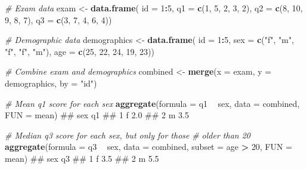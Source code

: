 \documentclass[]{book}
\newenvironment{Shaded}{\begin{snugshade}}{\end{snugshade}}
\newcommand{\KeywordTok}[1]{\textcolor[rgb]{0.13,0.29,0.53}{\textbf{#1}}}
\newcommand{\DataTypeTok}[1]{\textcolor[rgb]{0.13,0.29,0.53}{#1}}
\newcommand{\DecValTok}[1]{\textcolor[rgb]{0.00,0.00,0.81}{#1}}
\newcommand{\StringTok}[1]{\textcolor[rgb]{0.31,0.60,0.02}{#1}}
\newcommand{\CommentTok}[1]{\textcolor[rgb]{0.56,0.35,0.01}{\textit{#1}}}
\newcommand{\OperatorTok}[1]{\textcolor[rgb]{0.81,0.36,0.00}{\textbf{#1}}}
\newcommand{\NormalTok}[1]{#1}
\theoremstyle{definition}
\theoremstyle{definition}
\theoremstyle{remark}
\begin{document}
\begin{Shaded}
\begin{Highlighting}[]
\CommentTok{# Exam data}
\NormalTok{exam <-}\StringTok{ }\KeywordTok{data.frame}\NormalTok{(}
  \DataTypeTok{id =} \DecValTok{1}\OperatorTok{:}\DecValTok{5}\NormalTok{,}
  \DataTypeTok{q1 =} \KeywordTok{c}\NormalTok{(}\DecValTok{1}\NormalTok{, }\DecValTok{5}\NormalTok{, }\DecValTok{2}\NormalTok{, }\DecValTok{3}\NormalTok{, }\DecValTok{2}\NormalTok{),}
  \DataTypeTok{q2 =} \KeywordTok{c}\NormalTok{(}\DecValTok{8}\NormalTok{, }\DecValTok{10}\NormalTok{, }\DecValTok{9}\NormalTok{, }\DecValTok{8}\NormalTok{, }\DecValTok{7}\NormalTok{),}
  \DataTypeTok{q3 =} \KeywordTok{c}\NormalTok{(}\DecValTok{3}\NormalTok{, }\DecValTok{7}\NormalTok{, }\DecValTok{4}\NormalTok{, }\DecValTok{6}\NormalTok{, }\DecValTok{4}\NormalTok{))}

\CommentTok{# Demographic data}
\NormalTok{demographics <-}\StringTok{ }\KeywordTok{data.frame}\NormalTok{(}
  \DataTypeTok{id =} \DecValTok{1}\OperatorTok{:}\DecValTok{5}\NormalTok{,}
  \DataTypeTok{sex =} \KeywordTok{c}\NormalTok{(}\StringTok{"f"}\NormalTok{, }\StringTok{"m"}\NormalTok{, }\StringTok{"f"}\NormalTok{, }\StringTok{"f"}\NormalTok{, }\StringTok{"m"}\NormalTok{),}
  \DataTypeTok{age =} \KeywordTok{c}\NormalTok{(}\DecValTok{25}\NormalTok{, }\DecValTok{22}\NormalTok{, }\DecValTok{24}\NormalTok{, }\DecValTok{19}\NormalTok{, }\DecValTok{23}\NormalTok{))}

\CommentTok{# Combine exam and demographics}
\NormalTok{combined <-}\StringTok{ }\KeywordTok{merge}\NormalTok{(}\DataTypeTok{x =}\NormalTok{ exam, }
              \DataTypeTok{y =}\NormalTok{ demographics, }
              \DataTypeTok{by =} \StringTok{"id"}\NormalTok{)}

\CommentTok{# Mean q1 score for each sex}
\KeywordTok{aggregate}\NormalTok{(}\DataTypeTok{formula =}\NormalTok{ q1 }\OperatorTok{~}\StringTok{ }\NormalTok{sex, }
          \DataTypeTok{data =}\NormalTok{ combined, }
          \DataTypeTok{FUN =}\NormalTok{ mean)}
\NormalTok{##   sex  q1}
\NormalTok{## 1   f 2.0}
\NormalTok{## 2   m 3.5}

\CommentTok{# Median q3 score for each sex, but only for those}
\CommentTok{#   older than 20}
\KeywordTok{aggregate}\NormalTok{(}\DataTypeTok{formula =}\NormalTok{ q3 }\OperatorTok{~}\StringTok{ }\NormalTok{sex, }
          \DataTypeTok{data =}\NormalTok{ combined,}
          \DataTypeTok{subset =}\NormalTok{ age }\OperatorTok{>}\StringTok{ }\DecValTok{20}\NormalTok{,}
          \DataTypeTok{FUN =}\NormalTok{ mean)}
\NormalTok{##   sex  q3}
\NormalTok{## 1   f 3.5}
\NormalTok{## 2   m 5.5}


\end{Highlighting}
\end{Shaded}
\end{document}
